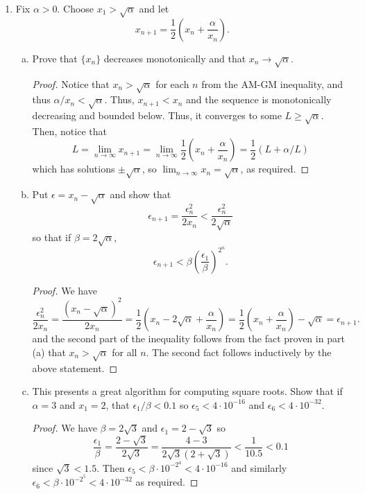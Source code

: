 \documentclass{scrbook}
\renewcommand{\to}{\rightarrow}
\begin{document}
\begin{enumerate}
\item %
Fix $\alpha > 0$. Choose $x_1 > \sqrt{\alpha}$ and let
\[
	x_{n+1} = \frac{1}{2} \left(x_n + \frac{\alpha}{x_n}\right).
\]
\begin{enumerate}[(a)]
\item Prove that $\{x_n\}$ decreases monotonically and that $x_n \to \sqrt{\alpha}$.

\begin{proof}
    Notice that $x_n > \sqrt{\alpha}$ for each $n$ from the AM-GM inequality, and thus $\alpha/x_n < \sqrt{\alpha}$. Thus, $x_{n+1} < x_n$ and the sequence is monotonically decreasing and bounded below. Thus, it converges to some $L \ge \sqrt{\alpha}$. Then, notice that 
    \[
        L = \lim_{n \to \infty} x_{n+1} = \lim_{n \to \infty} \frac{1}{2} \left(x_n + \frac{\alpha}{x_n} \right) = \frac{1}{2} (L + \alpha/L)
    \]
    which has solutions $\pm \sqrt{\alpha}$, so $\lim_{n \to \infty} x_n = \sqrt{\alpha}$, as required.
\end{proof}

\item Put $\epsilon = x_n - \sqrt{\alpha}$ and show that
\[
	\epsilon_{n+1} = \frac{\epsilon_n^2}{2x_n} < \frac{\epsilon_n^2}{2\sqrt{\alpha}}
\]
so that if $\beta = 2\sqrt{\alpha}$,
\[
	\epsilon_{n+1} < \beta\left(\frac{\epsilon_1}{\beta}\right)^{2^n}.
\]

\begin{proof}
    We have
    \[
        \frac{\epsilon_n^2}{2x_n} = \frac{(x_n - \sqrt{\alpha})^2}{2x_n} = \frac{1}{2} \left( x_n - 2\sqrt{\alpha} + \frac{\alpha}{x_n} \right) = \frac{1}{2} \left( x_n + \frac{\alpha}{x_n} \right) - \sqrt{\alpha} = \epsilon_{n+1}.
    \]
    and the second part of the inequality follows from the fact proven in part (a) that $x_n > \sqrt{\alpha}$ for all $n$. The second fact follows inductively by the above statement.
\end{proof}

\item This presents a great algorithm for computing square roots. Show that if $\alpha = 3$ and $x_1 = 2$, that $\epsilon_1/\beta < 0.1$ so $\epsilon_5 < 4 \cdot 10^{-16}$ and $\epsilon_6 < 4 \cdot 10^{-32}$.

\begin{proof}
    We have $\beta = 2\sqrt{3}$ and $\epsilon_1 = 2 - \sqrt{3}$ so
    \[
        \frac{\epsilon_1}{\beta} = \frac{2 - \sqrt{3}}{2 \sqrt{3}} = \frac{4 - 3}{2 \sqrt{3} (2 + \sqrt{3})} < \frac{1}{10.5} < 0.1
    \]
    since $\sqrt{3} < 1.5$. Then $\epsilon_5 < \beta \cdot 10^{-2^4} < 4 \cdot 10^{-16}$ and similarly $\epsilon_6 < \beta \cdot 10^{-2^5} < 4 \cdot 10^{-32}$ as required.
\end{proof}
\end{enumerate}


\end{enumerate}
\end{document}
